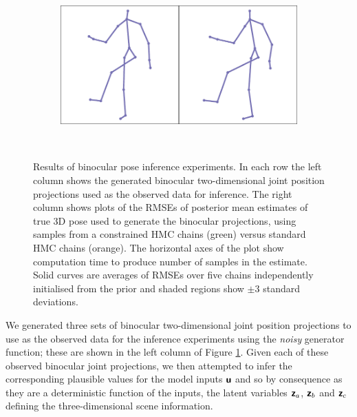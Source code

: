 \begin{figure}
\begin{subfigure}[b]{0.4\textwidth}
  \vspace{1cm}
\end{subfigure}
~~
\begin{subfigure}[b]{0.55\textwidth}
\end{subfigure}
\\[5mm]
\begin{subfigure}[b]{0.4\textwidth}
  \includegraphics[width=\textwidth]{images/binocular-pose-obs-3.pdf}
  \vspace{1cm}
\end{subfigure}
~~
\begin{subfigure}[b]{0.55\textwidth}
\end{subfigure}
\caption[Binocular pose inference results.]{Results of binocular pose inference experiments. In each row the left column shows the generated binocular two-dimensional joint position projections used as the observed data for inference. The right column shows plots of the \acp{RMSE} of posterior mean estimates of true 3D pose used to generate the binocular projections, using samples from a constrained \ac{HMC} chains (green) versus standard \ac{HMC} chains (orange). The horizontal axes of the plot show computation time to produce number of samples in the estimate. Solid curves are averages of \acp{RMSE} over five chains independently initialised from the prior and shaded regions show $\pm 3$ standard deviations.}
\label{fig:pose-inference}
\end{figure}

We generated three sets of binocular two-dimensional joint position projections to use as the observed data for the inference experiments using the \emph{noisy} generator function; these are shown in the left column of Figure \ref{fig:pose-inference}. Given each of these observed binocular joint projections, we then attempted to infer the corresponding plausible values for the model inputs $\boldsymbol{\mathsf{u}}$ and so by consequence as they are a deterministic function of the inputs, the latent variables $\boldsymbol{\mathsf{z}}_a$, $\boldsymbol{\mathsf{z}}_b$ and $\boldsymbol{\mathsf{z}}_c$ defining the three-dimensional scene information.

